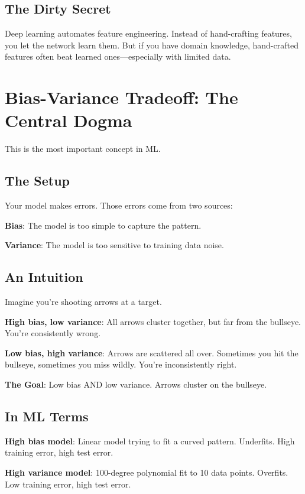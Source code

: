 \documentclass[11pt,oneside]{book}
\begin{document}
\subsection{The Dirty Secret}

Deep learning automates feature engineering. Instead of hand-crafting features, you let the network learn them. But if you have domain knowledge, hand-crafted features often beat learned ones—especially with limited data.

\section{Bias-Variance Tradeoff: The Central Dogma}

This is the most important concept in ML.

\subsection{The Setup}

Your model makes errors. Those errors come from two sources:

\textbf{Bias}: The model is too simple to capture the pattern.

\textbf{Variance}: The model is too sensitive to training data noise.

\subsection{An Intuition}

Imagine you're shooting arrows at a target.

\textbf{High bias, low variance}: All arrows cluster together, but far from the bullseye. You're consistently wrong.

\textbf{Low bias, high variance}: Arrows are scattered all over. Sometimes you hit the bullseye, sometimes you miss wildly. You're inconsistently right.

\textbf{The Goal}: Low bias AND low variance. Arrows cluster on the bullseye.

\subsection{In ML Terms}

\textbf{High bias model}: Linear model trying to fit a curved pattern. Underfits. High training error, high test error.

\textbf{High variance model}: 100-degree polynomial fit to 10 data points. Overfits. Low training error, high test error.
\end{document}
